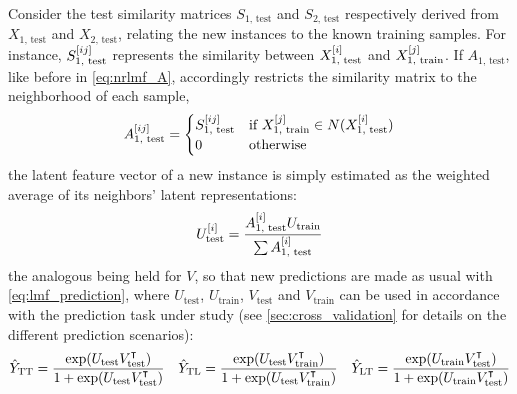 Consider the test similarity matrices $S_{1\text{, test}}$ and $S_{2\text{, test}}$ respectively derived from $X_\text{1, test}$ and $X_\text{2, test}$, relating the new instances to the known training samples. For instance, $S_{1\text{, test}}^{[ij]}$ represents the similarity between $X_\text{1, test}^{[i]}$ and $X_\text{1, train}^{[j]}$. If $A_\text{1, test}$, like before in \autoref{eq:nrlmf_A}, accordingly restricts the similarity matrix to the neighborhood of each sample,
%
\begin{equation}
    A_\text{1, test}^{[ij]} =
    \begin{cases}
        S_\text{1, test}^{[ij]} & \text{if } X_\text{1, train}^{[j]} \in N(X_\text{1, test}^{[i]})\\
        0 & \text{otherwise}
    \end{cases}
    \label{eq:nrlmf_A_test}
\end{equation}
%
the latent feature vector of a new instance is simply estimated as the weighted average of its neighbors' latent representations:
%
\begin{equation}
    U_\text{test}^{[i]} = \frac{A_\text{1, test}^{[i]} U_\text{train}}{\sum A_\text{1, test}^{[i]}}
\end{equation}
%
the analogous being held for $V$, so that new predictions are made as usual with \autoref{eq:lmf_prediction}, where $U_\text{test}$, $U_\text{train}$, $V_\text{test}$ and $V_\text{train}$ can be used in accordance with the prediction task under study (see \autoref{sec:cross_validation} for details on the different prediction scenarios):
%
\begin{gather}
    \begin{aligned}
        \hat Y_\text{TT} = \frac{\exp(U_\text{test} V_\text{test}^\intercal)}{1 + \exp(U_\text{test} V_\text{test}^\intercal)}&&
        \hat Y_\text{TL} = \frac{\exp(U_\text{test} V_\text{train}^\intercal)}{1 + \exp(U_\text{test} V_\text{train}^\intercal)}&&
        \hat Y_\text{LT} = \frac{\exp(U_\text{train} V_\text{test}^\intercal)}{1 + \exp(U_\text{train} V_\text{test}^\intercal)}
    \end{aligned}
\end{gather}






